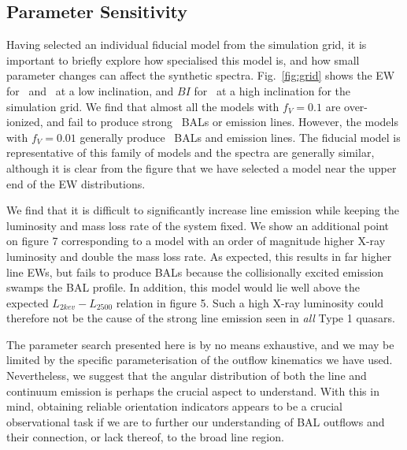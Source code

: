 \documentclass[useAMS,usenatbib]{mn2e_x}
\begin{document}
\subsection{Parameter Sensitivity}

\label{sec:param_sens}

Having selected an individual fiducial model from the simulation grid, it is important
to briefly explore how specialised this model is, and how small parameter
changes can affect the synthetic spectra. Fig.~\ref{fig:grid}
shows the EW for \civline\ and \mgline\ at a low inclination, 
and $BI$ for \civline\ at a high inclination for the simulation
grid. We find that almost all the models with $f_V=0.1$ are over-ionized, and 
fail to produce strong \civ\ BALs or emission lines. However, 
the models with $f_V=0.01$ generally produce \civ\ BALs and emission lines.
The fiducial model is representative of this family of models and 
the spectra are generally similar, although it is clear from the figure
that we have selected a model near the upper end of the EW distributions.

We find that it is difficult to significantly increase line emission while
keeping the luminosity and mass loss rate of the system fixed.
We show an additional point on figure 7 corresponding to a model with an order of
magnitude higher X-ray luminosity and double the mass loss rate. As expected, 
this results in far higher line EWs, but fails to produce BALs because
the collisionally excited emission swamps the BAL profile. In addition,
this model would lie well above the expected $L_{2kev}-L_{2500}$ 
relation in figure 5. Such a high X-ray luminosity could therefore 
not be the cause of the strong line emission seen in {\em all} Type 1 quasars.

The parameter search presented here is by no means exhaustive, and
we may be limited by the specific parameterisation of the outflow 
kinematics we have used. Nevertheless, we suggest that the angular distribution
of both the line and continuum emission is perhaps the crucial 
aspect to understand. With this in mind, obtaining reliable orientation 
indicators appears to be a crucial observational task if we are to
further our understanding of BAL outflows 
and their connection, or lack thereof, to the 
broad line region. 



\end{document}

